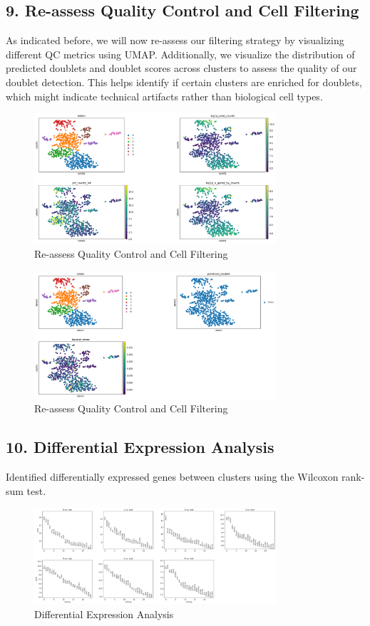 \documentclass[12pt]{article}
\begin{document}
\subsection{9. Re-assess Quality Control and Cell Filtering}
As indicated before, we will now re-assess our filtering strategy by visualizing different QC metrics using UMAP. Additionally, we visualize the distribution of predicted doublets and doublet scores across clusters to assess the quality of our doublet detection. This helps identify if certain clusters are enriched for doublets, which might indicate technical artifacts rather than biological cell types.

\begin{figure}[H]
    \centering
    \includegraphics[width=0.8\textwidth]{umap_qc.png}
    \caption{Re-assess Quality Control and Cell Filtering}
    \label{fig:umap_qc}
\end{figure}

\begin{figure}[H]
    \centering
    \includegraphics[width=0.8\textwidth]{umap_doublets_qc.png}
    \caption{Re-assess Quality Control and Cell Filtering}
    \label{fig:umap_doublets_qc}
\end{figure}

\subsection{10. Differential Expression Analysis}
Identified differentially expressed genes between clusters using the Wilcoxon rank-sum test.

\begin{figure}[H]
    \centering
    \includegraphics[width=0.8\textwidth]{de.png}
    \caption{Differential Expression Analysis}
    \label{fig:de}
\end{figure}
\end{document}

